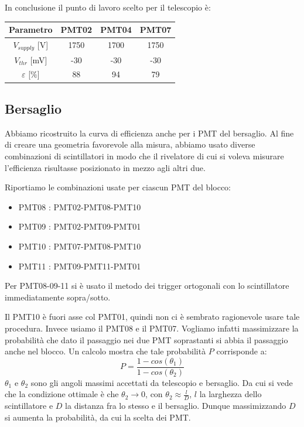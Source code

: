 \documentclass[10pt,a4paper]{article}
\begin{document}
\vspace{1.2cm}

In conclusione il punto di lavoro scelto per il telescopio è:

\begin{center}
\vspace{0.6cm}

\begin{tabular}{cccc}
\toprule
Parametro & PMT02 & PMT04 & PMT07 \\
\midrule
$V_{supply}$ [V] & 1750 & 1700 & 1750 \\
$V_{thr}$ [mV] & -30 & -30 & -30 \\
$\varepsilon$ [$\%$] & 88 & 94 & 79 \\
\bottomrule
\end{tabular}
\end{center}

\subsection{Bersaglio}

Abbiamo ricostruito la curva di efficienza anche per i PMT del bersaglio. 
Al fine di creare una geometria favorevole alla misura, abbiamo usato diverse combinazioni di scintillatori in modo che il rivelatore di cui si voleva misurare l'efficienza risultasse posizionato in mezzo agli altri due.

Riportiamo le combinazioni usate per ciascun PMT del blocco:

\begin{itemize}

\item PMT08 : PMT02-PMT08-PMT10 
\item PMT09 : PMT02-PMT09-PMT01
\item PMT10 : PMT07-PMT08-PMT10
\item PMT11 : PMT09-PMT11-PMT01

\end{itemize}

Per PMT08-09-11 si è usato il metodo dei trigger ortogonali con lo scintillatore immediatamente sopra/sotto.

Il PMT10 è fuori asse col PMT01, quindi non ci è sembrato ragionevole usare tale procedura. Invece usiamo il PMT08 e il PMT07. Vogliamo infatti massimizzare la probabilità che dato il passaggio nei due PMT soprastanti si abbia il passaggio anche nel blocco. Un calcolo mostra che tale probabilità $P$ corrisponde a: 
\begin{equation}
P = \frac{1- cos(\theta_1)}{1- cos(\theta_2)}
\end{equation}
$\theta_1$ e $\theta_2$ sono gli angoli massimi accettati da telescopio e bersaglio. Da cui si vede che la condizione ottimale è che $\theta_2\rightarrow0$, con $\theta_2\approx \frac{l}{D}$, $l$ la larghezza dello scintillatore e $D$ la distanza fra lo stesso e il bersaglio. Dunque massimizzando $D$ si aumenta la probabilità, da cui la scelta dei PMT.
\end{document}
